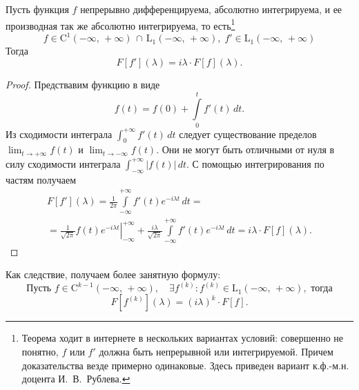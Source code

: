 \begin{theorem}
        Пусть функция $f$ непрерывно дифференцируема, абсолютно интегрируема, и ее производная так же абсолютно интегрируема, то есть\footnote{Теорема ходит в интернете в нескольких вариантах условий: совершенно не понятно, $f$ или $f'$ должна быть непрерывной или интегрируемой. Причем доказательства везде примерно одинаковые. Здесь приведен вариант к.ф.-м.н. доцента И.~В.~Рублева.}
$$
        f \in \mathrm{C}^1(-\infty,\,+\infty)\,\cap\,\mathrm{L}_1(-\infty,\,+\infty),\;f' \in \mathrm{L}_1(-\infty,\,+\infty)
$$
        Тогда
$$
        F[f'](\lambda) = i\lambda \cdot F[f](\lambda).
$$
\end{theorem}
\begin{proof}
        Предствавим функцию в виде
$$
        f(t) = f(0) + \int\limits_{0}^{t} f'(t)\,dt.
$$
        Из сходимости интеграла $\int_0^{+\infty}f'(t)\,dt$ следует существование пределов $\lim_{t\to+\infty}f(t)$ и $\lim_{t\to-\infty}f(t)$. Они не могут быть отличными от нуля в силу сходимости интеграла $\int_{-\infty}^{+\infty}|f(t)|\,dt$. С помощью интегрирования по частям получаем
\begin{multline*}
        F[f'](\lambda) = \frac{1}{2\pi}\int\limits_{-\infty}^{+\infty}f'(t)e^{-i\lambda t}\,dt=\\
        =
        \left.\frac{1}{\sqrt{2\pi}}f(t)e^{-i\lambda t}\right|_{-\infty}^{+\infty}
        +
        \frac{i\lambda}{\sqrt{2\pi}}\int\limits_{-\infty}^{+\infty}f'(t)e^{-i\lambda t}\,dt
        = i\lambda\cdot F[f](\lambda).
\end{multline*}
\end{proof}
\begin{remark}
        Как следствие, получаем более занятную формулу:
$$
        \mbox{Пусть } f \in \mathrm{C}^{k-1}(-\infty,\,+\infty),\quad \exists f^{(k)}:f^{(k)}\in\mathrm{L}_1(-\infty,\,+\infty), \mbox{ тогда} 
$$
$$
        F[f^{(k)}](\lambda) = (i\lambda)^k\cdot F[f].
$$
\end{remark}

